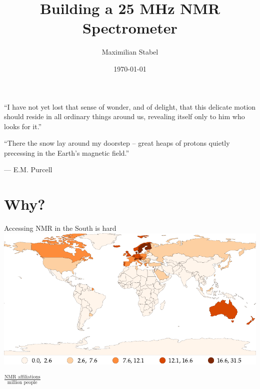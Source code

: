\documentclass{ethpresentation}
\title{Building a 25 MHz NMR Spectrometer}
\date{\today}
\author{Maximilian Stabel}
\institute{ETH Zürich}
\begin{document}
\maketitle %

\begin{frame}{}
  \begin{center}
    \enquote{I have not yet lost that sense of wonder, and of delight, that this delicate motion should reside in all ordinary things around us, revealing itself only to him who looks for it.}

    \enquote{There the snow lay around my doorstep -- great heaps of protons quietly precessing in the Earth's magnetic field.}
  \end{center}

  \hfill{}--- E.M. Purcell
\end{frame}




\section{Why?}

\begin{frame}{Accessing NMR in the South is hard}
  \centering
  \includegraphics[height=0.8\textheight]{images/nmr-affiliations-per-million-people_naturalbreaks.pdf}

  \(\frac{\text{NMR affiliations}}{\text{million people}}\)
\end{frame}
\end{document}
